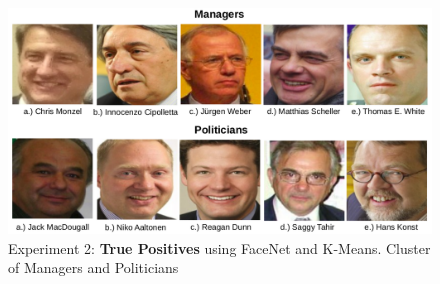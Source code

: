 \documentclass[12pt,english]{article}
\begin{document}
\begin{figure}[H]
 \centering
    \includegraphics[width=\columnwidth]{figures/manager.png}
    \caption{Experiment 2: \textbf{True Positives} using FaceNet and K-Means. Cluster of Managers and Politicians}
    \label{fig:ex2tp}
\end{figure}
\end{document}
